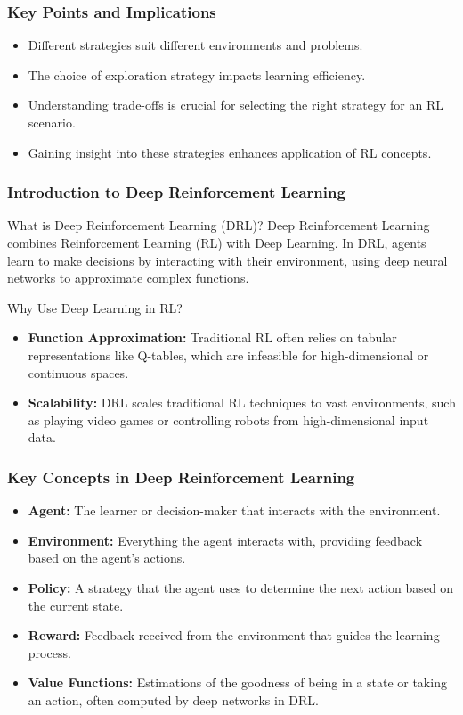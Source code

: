 \documentclass{beamer}
\begin{document}
\begin{frame}[fragile]
    \frametitle{Key Points and Implications}
    \begin{itemize}
        \item Different strategies suit different environments and problems.
        \item The choice of exploration strategy impacts learning efficiency.
        \item Understanding trade-offs is crucial for selecting the right strategy for an RL scenario.
        \item Gaining insight into these strategies enhances application of RL concepts.
    \end{itemize}
\end{frame}

\begin{frame}[fragile]
    \frametitle{Introduction to Deep Reinforcement Learning}
    \begin{block}{What is Deep Reinforcement Learning (DRL)?}
        Deep Reinforcement Learning combines Reinforcement Learning (RL) with Deep Learning. In DRL, agents learn to make decisions by interacting with their environment, using deep neural networks to approximate complex functions.
    \end{block}
    
    \begin{block}{Why Use Deep Learning in RL?}
        \begin{itemize}
            \item \textbf{Function Approximation:} Traditional RL often relies on tabular representations like Q-tables, which are infeasible for high-dimensional or continuous spaces.
            \item \textbf{Scalability:} DRL scales traditional RL techniques to vast environments, such as playing video games or controlling robots from high-dimensional input data.
        \end{itemize}
    \end{block}
\end{frame}

\begin{frame}[fragile]
    \frametitle{Key Concepts in Deep Reinforcement Learning}
    \begin{itemize}
        \item \textbf{Agent:} The learner or decision-maker that interacts with the environment.
        \item \textbf{Environment:} Everything the agent interacts with, providing feedback based on the agent's actions.
        \item \textbf{Policy:} A strategy that the agent uses to determine the next action based on the current state.
        \item \textbf{Reward:} Feedback received from the environment that guides the learning process.
        \item \textbf{Value Functions:} Estimations of the goodness of being in a state or taking an action, often computed by deep networks in DRL.
    \end{itemize}
\end{frame}
\end{document}
